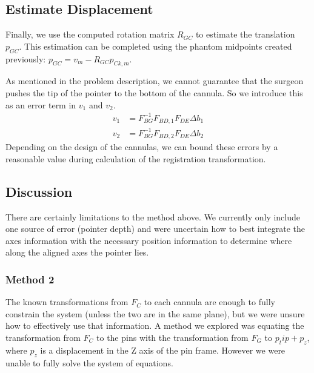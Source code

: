 \documentclass[letterpaper, 11pt]{article}
\begin{document}
\subsection*{Estimate Displacement}
Finally, we use the computed rotation matrix $R_{GC}$ to estimate the translation $p_{GC}$. This estimation can be completed using the phantom midpoints created previously: $p_{GC} = v_m - R_{GC}p_{Ck,m}$. 

As mentioned in the problem description, we cannot guarantee that the surgeon pushes the tip of the pointer to the bottom of the cannula. So we introduce this as an error term in $v_1$ and $v_2$. 
\begin{align}
v_1 &= F_{BG}^{-1}F_{BD,1}F_{DE}\Delta b_1 \\
v_2 &= F_{BG}^{-1}F_{BD,2}F_{DE}\Delta b_2
\end{align}
Depending on the design of the cannulas, we can bound these errors by a reasonable value during calculation of the registration transformation.

\subsection*{Discussion}
There are certainly limitations to the method above. We currently only include one source of error (pointer depth) and were uncertain how to best integrate the axes information with the necessary position information to determine where along the aligned axes the pointer lies.
\subsubsection*{Method 2}
The known transformations from $F_C$ to each cannula are enough to fully constrain the system (unless the two are in the same plane), but we were unsure how to effectively use that information. A method we explored was equating the transformation from $F_C$ to the pins with the transformation from $F_G$ to $p_tip + p_z$, where $p_z$ is a displacement in the Z axis of the pin frame. However we were unable to fully solve the system of equations.

  
\end{document}
